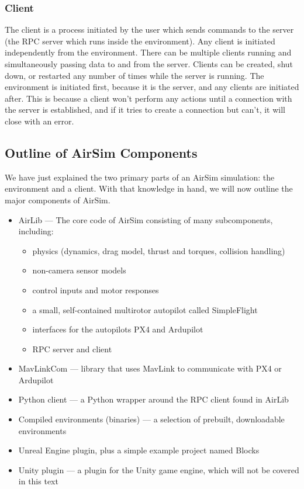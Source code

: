 \subsubsection{Client}
The client is a process initiated by the user which sends commands to the server (the RPC server which runs inside the environment). Any client is initiated independently from the environment. There can be multiple clients running and simultaneously passing data to and from the server. Clients can be created, shut down, or restarted any number of times while the server is running. The environment is initiated first, because it is the server, and any clients are initiated after. This is because a client won't perform any actions until a connection with the server is established, and if it tries to create a connection but can't, it will close with an error.

\subsection{Outline of AirSim Components}
We have just explained the two primary parts of an AirSim simulation: the environment and a client. With that knowledge in hand, we will now outline the major components of AirSim.

\begin{itemize}
    \item AirLib --- The core \CC code of AirSim consisting of many subcomponents, including:
    \begin{itemize}
        \item physics (dynamics, drag model, thrust and torques, collision handling)
        \item non-camera sensor models
        \item control inputs and motor responses
        \item a small, self-contained multirotor autopilot called SimpleFlight
        \item interfaces for the autopilots PX4 and Ardupilot
        \item RPC server and client
    \end{itemize}
    \item MavLinkCom --- \CC library that uses MavLink to communicate with PX4 or Ardupilot
    \item Python client --- a Python wrapper around the \CC RPC client found in AirLib
    \item Compiled environments (binaries) --- a selection of prebuilt, downloadable environments
    \item Unreal Engine plugin, plus a simple example project named Blocks
    \item Unity plugin --- a plugin for the Unity game engine, which will not be covered in this text
\end{itemize}

